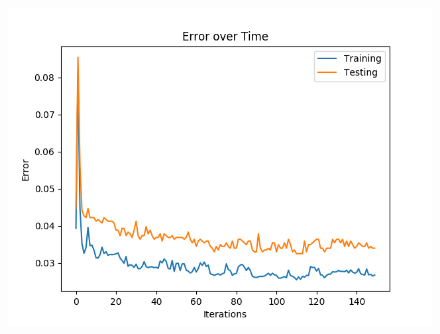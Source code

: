 \documentclass{article}
\newcommand{\1}{\mathbf{1}}
\begin{document}
{\begin{figure}[hb]
  \centering
  \includegraphics[width=150mm]{../hw2-code/results/a6_dii.png}
\end{figure}

}
\end{document}
